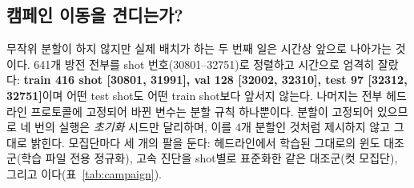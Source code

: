 \documentclass[10pt,a4paper]{article}
\begin{document}
\subsection{캠페인 이동을 견디는가?}
\label{sec:campaign}

무작위 분할이 하지 않지만 실제 배치가 하는 두 번째 일은 시간상 앞으로 나아가는
것이다. 641개 방전 전부를 shot 번호(30801--32751)로 정렬하고 시간으로 엄격히
잘랐다: \textbf{train 416 shot [30801, 31991], val 128 [32002, 32310], test 97
[32312, 32751]}이며 어떤 test shot도 어떤 train shot보다 앞서지 않는다. 나머지는
전부 헤드라인 프로토콜에 고정되어 바뀐 변수는 분할 규칙 하나뿐이다. 분할이
고정되어 있으므로 네 번의 실행은 \emph{초기화} 시드만 달리하며, 이를 4개 분할인
것처럼 제시하지 않고 그대로 밝힌다. 모집단마다 세 개의 팔을 둔다: 헤드라인에서
학습된 그대로의 윈도 대조군(학습 파일 전용 정규화), 고속 진단을 shot별로
표준화한 같은 대조군(컷 모집단), 그리고 \seqv{}이다(표~\ref{tab:campaign}).

\begin{table}[t]
  \centering
  \caption{시간(캠페인) 분할, 4개 초기화, 뒤쪽 방전 97개로 이루어진 TEST 블록.
  항목은 $\skillp$이며 \textbf{굵은 글씨} = PR4 PASS. 마지막 열은 같은 행 위에서
  윈도 대조군에 대한 \seqv{}의 짝지은 \Ti{} skill이다.}
  \label{tab:campaign}
  \small
\end{table}
\end{document}

